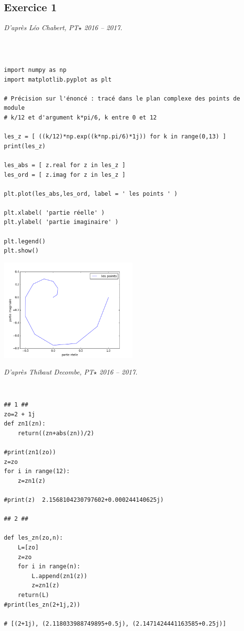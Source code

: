 \documentclass[10pt,fleqn]{article} %
\begin{document}
\subsection*{Exercice 1}

\textit{D'après Léo Chabert, PT$\star$ 2016 -- 2017.}
\begin{corrige}
$\quad$
\begin{lstlisting}

import numpy as np
import matplotlib.pyplot as plt

# Précision sur l'énoncé : tracé dans le plan complexe des points de module
# k/12 et d'argument k*pi/6, k entre 0 et 12 

les_z = [ ((k/12)*np.exp((k*np.pi/6)*1j)) for k in range(0,13) ]
print(les_z)

les_abs = [ z.real for z in les_z ]
les_ord = [ z.imag for z in les_z ]

plt.plot(les_abs,les_ord, label = ' les points ' )

plt.xlabel( 'partie réelle' )
plt.ylabel( 'partie imaginaire' )

plt.legend()
plt.show()
\end{lstlisting}
\end{corrige}
\includegraphics[width=7cm]{programmes/Exercice_2015_01/Exercice_2015_01_Chabert}

\textit{D'après Thibaut Decombe, PT$\star$ 2016 -- 2017.}
\begin{corrige}
$\quad$
\begin{lstlisting}
## 1 ##
zo=2 + 1j
def zn1(zn):
    return((zn+abs(zn))/2)

#print(zn1(zo))
z=zo
for i in range(12):
    z=zn1(z)
    
#print(z)  2.1568104230797602+0.000244140625j)
    
## 2 ##
    
def les_zn(zo,n):
    L=[zo]
    z=zo
    for i in range(n):
        L.append(zn1(z))
        z=zn1(z)
    return(L)
#print(les_zn(2+1j,2))

# [(2+1j), (2.118033988749895+0.5j), (2.1471424441163585+0.25j)]
\end{lstlisting}
\end{corrige}
\end{document}
